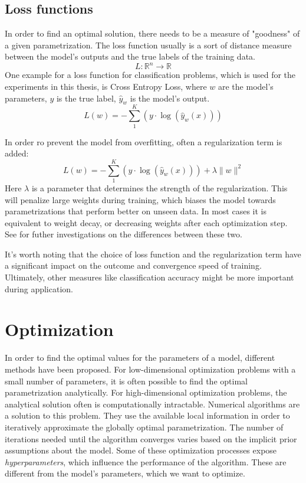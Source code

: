 \documentclass[twoside,12pt,a4paper]{report}
\begin{document}
\subsection{Loss functions}
In order to find an optimal solution, there needs to be a measure of "goodness" of a given parametrization.
The loss function usually is a sort of distance measure between the model's outputs and the true labels of the training data.
$$L: \mathbb{R}^n \rightarrow \mathbb{R}$$
One example for a loss function for classification problems, which is used for the experiments in this thesis, is Cross Entropy Loss, where $w$ are the model's parameters, $y$ is the true label, $\hat{y}_w$ is the model's output.
$$L(w) = - \sum_{1}^{K}(y \cdot \log(\hat{y}_w(x)))$$

In order ro prevent the model from overfitting, often a regularization term is added:
$$L(w) = - \sum_{1}^{K}(y \cdot \log(\hat{y}_w(x) )) + \lambda \| w\|^2 $$
Here $\lambda$ is a parameter that determines the strength of the regularization. This will penalize large weights during training, which biases the model towards parametrizations that perform better on unseen data. In most cases it is equivalent to weight decay, or decreasing weights after each optimization step. See \cite{Chaudhari2017entropy} for futher investigations on the differences between these two.

It's worth noting that the choice of loss function and the regularization term have a significant impact on the outcome and convergence speed of training. Ultimately, other measures like classification accuracy might be more important during application.

\section{Optimization}
In order to find the optimal values for the parameters of a model, different methods have been proposed. For low-dimensional optimization problems with a small number of parameters, it is often possible to find the optimal parametrization analytically. For high-dimensional optimization problems, the analytical solution often is computationally intractable. Numerical algorithms are a solution to this problem.
They use the available local information in order to iteratively approximate the globally optimal parametrization. The number of iterations needed until the algorithm converges varies based on the implicit prior assumptions about the model.
Some of these optimization processes expose \textit{hyperparameters}, which influence the performance of the algorithm. These are different from the model's parameters, which we want to optimize.
\end{document}
